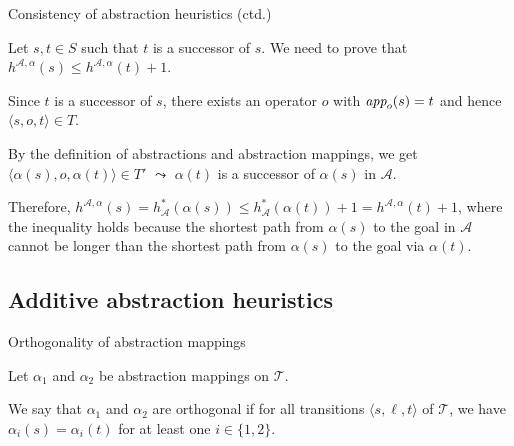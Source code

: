 \documentclass{gkibeamer}
\begin{document}
\begin{frame}{Consistency of abstraction heuristics (ctd.)}
  \begin{proofend}
     Let $s, t \in S$ such that $t$ is a
    successor of $s$. We need to prove that
    $h^{\mathcal A, \alpha}(s) \le h^{\mathcal A, \alpha}(t) + 1$.

    \pause
    
    Since $t$ is a successor of $s$, there exists an operator $o$ with
    $\textit{app}_{o}(s) = t$ and hence $\langle s, o, t\rangle \in T$.

    \pause

    By the definition of abstractions and abstraction mappings,
    we get $\langle \alpha(s), o, \alpha(t)\rangle \in T'$ $\leadsto$
    $\alpha(t)$ is a successor of $\alpha(s)$ in $\mathcal A$.

    \pause

    Therefore,
    $h^{\mathcal A, \alpha}(s)
    = h^*_{\mathcal A}(\alpha(s))
    \le h^*_{\mathcal A}(\alpha(t)) + 1
    = h^{\mathcal A, \alpha}(t) + 1$, where the inequality holds because
    the shortest path from $\alpha(s)$ to the goal in $\mathcal A$
    cannot be longer than the shortest path from $\alpha(s)$ to the
    goal via $\alpha(t)$.
  \end{proofend}
\end{frame}

\subsection[Additivity]{Additive abstraction heuristics}

\begin{frame}{Orthogonality of abstraction mappings}
  \begin{definition}
    Let $\alpha_1$ and $\alpha_2$ be abstraction mappings on $\mathcal
    T$.

    \medskip

    We say that $\alpha_1$ and $\alpha_2$ are \alert{orthogonal}
    if for all transitions $\langle s, \ell, t\rangle$ of $\mathcal T$,
    we have $\alpha_i(s) = \alpha_i(t)$ for at least one $i \in \{1, 2\}$.
  \end{definition}
\end{frame}
\end{document}
